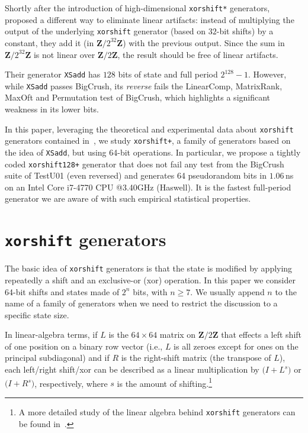 \documentclass{acmsmalltr}
\newcommand{\Z}{\mathbf Z}
\newcommand{\xorshift}[1][]{\texttt{xorshift#1}\xspace}
\newcommand{\xorshifts}[1][]{\texttt{xorshift#1*}\xspace}
\newcommand{\xorshiftp}[1][]{\texttt{xorshift#1+}\xspace}
\newcommand{\xsadd}{\texttt{XSadd}\xspace}
\begin{document}
Shortly after the introduction of high-dimensional \xorshifts generators,
 proposed a different way to eliminate linear artifacts: instead of
multiplying the output of the underlying \xorshift generator (based on $32$-bit shifts) by a
constant, they add it (in $\Z/2^{32}\Z$) with the previous output. Since the sum
in $\Z/2^{32}\Z$ is not linear over $\Z/2\Z$, the result should be
free of linear artifacts.

Their generator \xsadd has $128$ bits of state and full period $2^{128}-1$.
However, while \xsadd passes BigCrush, its \emph{reverse} fails
the LinearComp, MatrixRank, MaxOft and Permutation test of
BigCrush, which highlights a significant weakness in its lower bits.

In this paper, leveraging the theoretical and experimental data about \xorshift
generators contained in~\cite{VigEEMXGS}, we study \xorshiftp, a family of
generators based on the idea of \xsadd, but using 64-bit operations. In
particular, we propose a tightly coded \xorshiftp[128] generator that
does not fail any test from the BigCrush suite of TestU01
(even reversed) and generates 64 pseudorandom bits in $1.06$\,ns on an
Intel\textregistered{} Core\texttrademark{} i7-4770 CPU @3.40GHz (Haswell). It
is the fastest full-period generator we are aware of with such empirical
statistical properties.



\section{{\fontsize{11pt}{11pt}\selectfont\xorshift} generators}

The basic idea of \xorshift generators is that the state is modified by
applying repeatedly a shift and an exclusive-or (xor) operation. In this paper we consider
64-bit shifts and states made of $2^n$ bits, with $n\geq 7$. We usually
append $n$ to the name of a family of generators when we need to restrict the discussion to a specific state size.

In linear-algebra terms, if $L$ is the $64\times 64$ matrix on $\Z/2\Z$ that
effects a left shift of one position on a binary row vector (i.e., $L$ is all zeroes except for ones on the
principal subdiagonal) and if $R$ is the right-shift
matrix (the transpose of $L$), each left/right shift/xor can be described as a linear multiplication
by $\bigl(I+L^s\bigr)$ or $\bigl(I+R^s\bigr)$, respectively, where $s$ is the
amount of shifting.\footnote{A more detailed study of the linear algebra behind \xorshift generators can be found in~\cite{MarXR,PaLXRNG}.}
\end{document}
